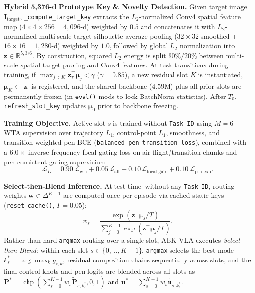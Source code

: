 \documentclass[10pt,twocolumn]{article}
\begin{document}
\textbf{Hybrid 5,376-d Prototype Key \& Novelty Detection.} Given target image $\mathbf{I}_{\text{target}}$, \texttt{\_compute\_target\_key} extracts the $L_2$-normalized Conv4 spatial feature map ($4\times 4 \times 256 = 4{,}096$-d) weighted by $0.5$ and concatenates it with $L_2$-normalized multi-scale target silhouette average pooling ($32\times 32$ smoothed + $16\times 16 = 1{,}280$-d) weighted by $1.0$, followed by global $L_2$ normalization into $\mathbf{z} \in \mathbb{R}^{5{,}376}$. By construction, squared $L_2$ energy is split $80\% / 20\%$ between multi-scale spatial target pooling and Conv4 features. At task transitions during training, if $\max_{j < K} \mathbf{z}_\tau^\top \boldsymbol{\mu}_j < \gamma$ ($\gamma = 0.85$), a new residual slot $K$ is instantiated, $\boldsymbol{\mu}_K \leftarrow \mathbf{z}_\tau$ is registered, and the shared backbone ($4.59\text{M}$) plus all prior slots are permanently frozen (in \texttt{eval()} mode to lock BatchNorm statistics). After $T_0$, \texttt{refresh\_slot\_key} updates $\boldsymbol{\mu}_0$ prior to backbone freezing.

\textbf{Training Objective.} Active slot $s$ is trained without \texttt{Task-ID} using $M=6$ WTA supervision over trajectory $L_1$, control-point $L_1$, smoothness, and transition-weighted pen BCE (\texttt{balanced\_pen\_transition\_loss}), combined with a $6.0\times$ inverse-frequency focal gating loss on air-flight/transition chunks and pen-consistent gating supervision:
\begin{equation}
    \mathcal{L}_D = 0.90\,\mathcal{L}_{\text{win}} + 0.05\,\mathcal{L}_{\text{all}} + 0.10\,\mathcal{L}_{\text{focal\_gate}} + 0.10\,\mathcal{L}_{\text{pen\_exp}}.
\end{equation}

\textbf{Select-then-Blend Inference.} At test time, without any \texttt{Task-ID}, routing weights $\mathbf{w} \in \Delta^{K-1}$ are computed once per episode via cached static keys (\texttt{reset\_cache()}, $T = 0.05$):
\begin{equation}
    w_s = \frac{\exp(\mathbf{z}^\top \boldsymbol{\mu}_s / T)}{\sum_{j=0}^{K-1} \exp(\mathbf{z}^\top \boldsymbol{\mu}_j / T)}.
\end{equation}
Rather than hard \texttt{argmax} routing over a single slot, ABK-VLA executes \textit{Select-then-Blend}: within each slot $s \in \{0, \dots, K-1\}$, \texttt{argmax} selects the best mode $k_s^* = \arg\max_k g_{s,k}$, residual composition chains sequentially across slots, and the final control knots and pen logits are blended across all slots as $\mathbf{P}^* = \operatorname{clip}(\sum_{s=0}^{K-1} w_s \tilde{\mathbf{P}}_{s,k_s^*}, 0, 1)$ and $\mathbf{u}^* = \sum_{s=0}^{K-1} w_s \tilde{\mathbf{u}}_{s,k_s^*}$.
\end{document}
